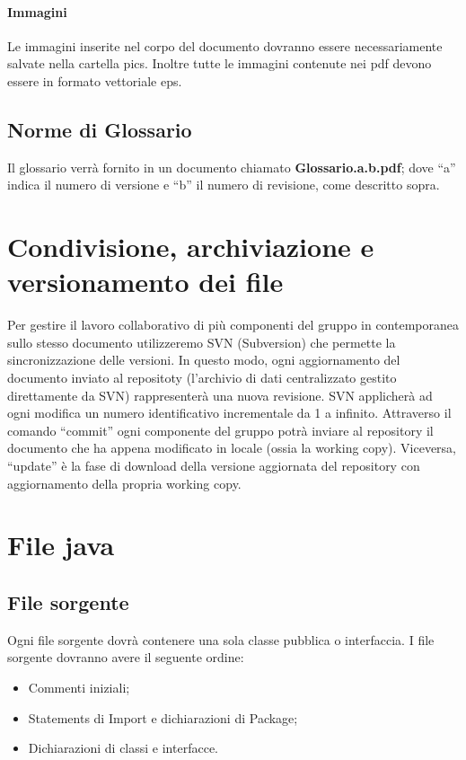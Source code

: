 \documentclass[11pt,titlepage,a4paper]{report}
\begin{document}
\subsubsection{Immagini}
Le immagini inserite nel corpo del documento dovranno essere necessariamente salvate nella cartella pics. Inoltre tutte le immagini contenute nei pdf devono essere in formato vettoriale eps.
\section{Norme di Glossario}
Il glossario verr\`a fornito in un documento chiamato \textbf{ Glossario.a.b.pdf}; dove ``a'' indica il numero di versione e ``b'' il numero di revisione, come descritto sopra.


\chapter{Condivisione, archiviazione e versionamento dei file}
Per gestire il lavoro collaborativo di pi\`u componenti del gruppo in contemporanea sullo stesso documento utilizzeremo SVN (Subversion) che permette la sincronizzazione delle versioni. In questo modo, ogni aggiornamento del documento inviato al repositoty (l'archivio di dati centralizzato gestito direttamente da SVN) rappresenter\`a una nuova revisione. SVN applicher\`a ad ogni modifica un numero identificativo incrementale da 1 a infinito. Attraverso il comando ``commit'' ogni componente del gruppo potr\`a inviare al repository il documento che ha appena modificato in locale (ossia la working copy). Viceversa, ``update'' \`e la fase di download della versione aggiornata del repository con aggiornamento della propria working copy. 

\chapter{File java}
\section{File sorgente}
Ogni file sorgente dovr\`a contenere una sola classe pubblica o interfaccia. I file sorgente dovranno avere il seguente ordine:
\begin{itemize}
\item Commenti iniziali;
\item Statements di Import e dichiarazioni di Package;
\item Dichiarazioni di classi e interfacce.
\end{itemize}
\end{document}
